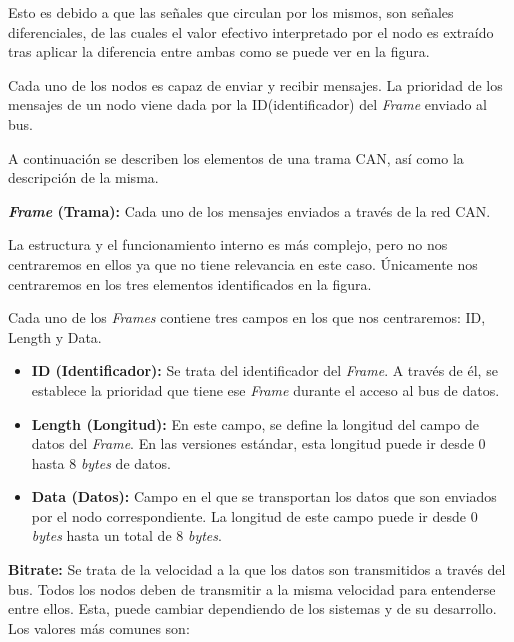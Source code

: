 Esto es debido a que las señales que circulan por los mismos, son señales diferenciales, de las cuales el valor efectivo interpretado por el nodo es extraído tras aplicar la diferencia entre ambas como se puede ver en la figura.


Cada uno de los nodos es capaz de enviar y recibir mensajes. La prioridad de los mensajes de un nodo viene dada por la ID(identificador) del \emph{Frame} enviado al bus.


A continuación se describen los elementos de una trama CAN, así como la descripción de la misma.

\textbf{\emph{Frame} (Trama):} Cada uno de los mensajes enviados a través de la red CAN.

La estructura y el funcionamiento interno es más complejo, pero no nos centraremos en ellos ya que no tiene relevancia en este caso. Únicamente nos centraremos en los tres elementos identificados en la figura.

Cada uno de los \emph{Frames} contiene tres campos en los que nos centraremos: ID, Length y Data.

\begin{itemize}
\item
\textbf{ID (Identificador):} Se trata del identificador del \emph{Frame}. A través de él, se establece la prioridad que tiene ese \emph{Frame} durante el acceso al bus de datos.
\item
\textbf{Length (Longitud):} En este campo, se define la longitud del campo de datos del \emph{Frame}. En las versiones estándar, esta longitud puede ir desde 0 hasta 8 \emph{bytes} de datos.
\item
\textbf{Data (Datos):} Campo en el que se transportan los datos que son enviados por el nodo correspondiente. La longitud de este campo puede ir desde 0 \emph{bytes} hasta un total de 8 \emph{bytes}.
\end{itemize}



\textbf{Bitrate:} Se trata de la velocidad a la que los datos son transmitidos a través del bus. Todos los nodos deben de transmitir a la misma velocidad para entenderse entre ellos. Esta, puede cambiar dependiendo de los sistemas y de su desarrollo.
Los valores más comunes son:

